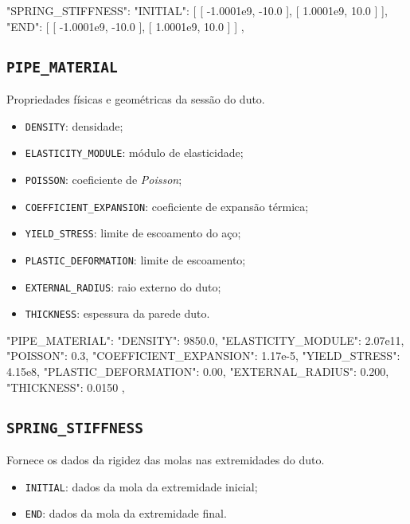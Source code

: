 \begin{jsoncode}
{
  "SPRING_STIFFNESS": {
    "INITIAL": [
      [
        -1.0001e9,
        -10.0
      ],
      [
        1.0001e9,
        10.0
      ]
    ],
    "END": [
      [
        -1.0001e9,
        -10.0
      ],
      [
        1.0001e9,
        10.0
      ]
    ]
  },
}
\end{jsoncode}

\subsection{\texttt{PIPE\_MATERIAL}}

Propriedades físicas e geométricas da sessão do duto.

\begin{itemize}
  \item \texttt{DENSITY}: densidade;
  \item \texttt{ELASTICITY\_MODULE}: módulo de elasticidade;
  \item \texttt{POISSON}: coeficiente de \textit{Poisson};
  \item \texttt{COEFFICIENT\_EXPANSION}: coeficiente de expansão térmica;
  \item \texttt{YIELD\_STRESS}: limite de escoamento do aço;
  \item \texttt{PLASTIC\_DEFORMATION}: limite de escoamento;
  \item \texttt{EXTERNAL\_RADIUS}: raio externo do duto;
  \item \texttt{THICKNESS}: espessura da parede duto.
\end{itemize}

\begin{jsoncode}
{
  "PIPE_MATERIAL": {
    "DENSITY": 9850.0,
    "ELASTICITY_MODULE": 2.07e11,
    "POISSON": 0.3,
    "COEFFICIENT_EXPANSION": 1.17e-5,
    "YIELD_STRESS": 4.15e8,
    "PLASTIC_DEFORMATION": 0.00,
    "EXTERNAL_RADIUS": 0.200,
    "THICKNESS": 0.0150
  },
}
\end{jsoncode}

\subsection{\texttt{SPRING\_STIFFNESS}}

Fornece os dados da rigidez das molas nas extremidades do duto.

\begin{itemize}
  \item \texttt{INITIAL}: dados da mola da extremidade inicial;
  \item \texttt{END}: dados da mola da extremidade final.
\end{itemize}


